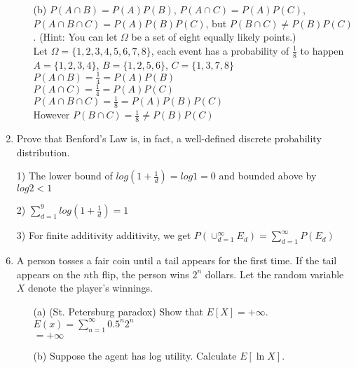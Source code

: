 \documentclass[letterpaper,12pt]{article}
\theoremstyle{definition}
\begin{document}
\begin{enumerate}
\begin{itemize}
			\item[(b)] $P(A  \cap B) = P(A)P(B)$, $P(A  \cap C) = P(A)P(C)$, $P(A  \cap B \cap C) = P(A)P(B)P(C)$, but $P(B  \cap C) \neq P(B)P(C)$. (Hint: You can let $\Omega$ be a set of eight equally likely points.)\\
			
			Let $\Omega = \{ 1, 2, 3, 4, 5, 6, 7, 8\}$, each event has a probability of $\frac{1}{8}$ to happen\\
			$A = \{1, 2, 3, 4\}$,
			$B = \{1, 2, 5, 6\}$,
			$C = \{1, 3, 7, 8\}$\\
			$P(A \cap B) = \frac{1}{4} = P(A)P(B)$\\
			$P(A \cap C) = \frac{1}{4} = P(A)P(C)$\\
			$P(A \cap B \cap C) = \frac{1}{8} = P(A)P(B)P(C)$\\
			However $P(B \cap C) = \frac{1}{8} \neq P(B)P(C)$\\
			
		\end{itemize}
   	\item Prove that Benford's Law is, in fact, a well-defined discrete probability distribution.\\
		\item[1)] 
		The lower bound of $log(1 + \frac{1}{d}) = log1 = 0$ and bounded above by $log2 < 1$\\

		\item[2)]
		$\sum_{d = 1}^{9} log(1 + \frac{1}{d}) = 1$\\

		\item[3)]
		For finite additivity additivity, we get $P(\cup_{d = 1}^{\infty} E_d) = \sum_{d = 1}^{\infty} P(E_d)$\\

   	\item A person tosses a fair coin until a tail appears for the first time. If the tail appears on the $n$th flip, the person wins $2^n$ dollars. Let the random variable $X$ denote the player's winnings.
		\begin{itemize}
			\item[(a)] (St. Petersburg paradox) Show that $E[X]= + \infty$.\\
			
			$E(x) = \sum_{n = 1}^{\infty} 0.5^n2^n$\\
			$= +\infty$

			\item[(b)] Suppose the agent has log utility. Calculate $E[\ln X]$.\\
			

\end{itemize}
\end{enumerate}
\end{document}
